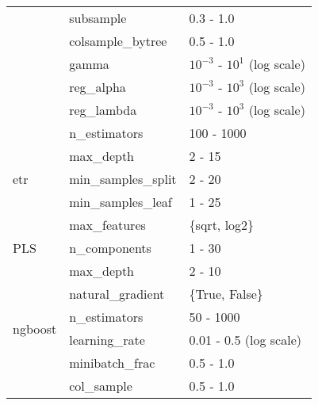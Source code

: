 \begin{table*}
\begin{tabular}{@{}l>{\ttfamily}lp{}@{}}
                               & subsample                   & 0.3 - 1.0                                 \\ \cmidrule{2-3}
                               & colsample\_bytree           & 0.5 - 1.0                                 \\ \cmidrule{2-3}
                               & gamma                       & $10^{-3}$ - $10^{1}$ (log scale)          \\ \cmidrule{2-3}
                               & reg\_alpha                  & $10^{-3}$ - $10^{3}$ (log scale)          \\ \cmidrule{2-3}
                               & reg\_lambda                 & $10^{-3}$ - $10^{3}$ (log scale)          \\ \midrule
\multirow{5}{*}{\gls{etr}}     & n\_estimators               & 100 - 1000                                \\ \cmidrule{2-3}
                               & max\_depth                  & 2 - 15                                    \\ \cmidrule{2-3}
                               & min\_samples\_split         & 2 - 20                                    \\ \cmidrule{2-3}
                               & min\_samples\_leaf          & 1 - 25                                    \\ \cmidrule{2-3}
                               & max\_features               & \{sqrt, log2\}                            \\ \midrule
PLS                            & n\_components               & 1 - 30                                    \\ \midrule
\multirow{8}{*}{\gls{ngboost}} & max\_depth                  & 2 - 10                                    \\ \cmidrule{2-3}
                               & natural\_gradient           & \{True, False\}                           \\ \cmidrule{2-3}
                               & n\_estimators               & 50 - 1000                                 \\ \cmidrule{2-3}
                               & learning\_rate              & 0.01 - 0.5 (log scale)                    \\ \cmidrule{2-3}
                               & minibatch\_frac             & 0.5 - 1.0                                 \\ \cmidrule{2-3}
                               & col\_sample                 & 0.5 - 1.0                                 \\ \cmidrule{2-3}

\end{tabular}
\end{table*}
